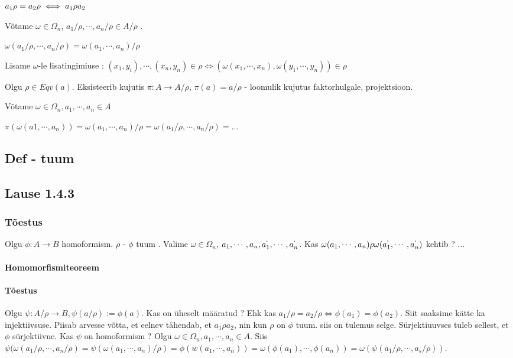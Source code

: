 \documentclass[12pt]{report}
\numberwithin{equation}{section}
\theoremstyle{definition}
\theoremstyle{plain}
\begin{document}
$a_1 \/ \rho = a_2 \/ \rho \iff a_1 \rho a_2$

Võtame $\omega \in \Omega_n$, $a_1 / \rho , \cdots , a_n / \rho \in A / \rho$ .

$\omega(a_1 / \rho , \cdots , a_n / \rho) = \omega(a_1,\cdots,a_n)/ \rho$

Lisame $\omega$-le lisatingimiuse : $(x_1,y_i),\cdots, (x_n,y_n)  \in \rho \iff ( \omega(x_1, \cdots , x_n), \omega(y_1,\cdots,y_n)) \in \rho$

Olgu $\rho \in Eqv(a)$.
Eksisteerib kujutis $ \pi : A \rightarrow A/ \rho$, $\pi (a) = a / \rho $ - loomulik kujutus faktorhulgale, projektsioon.


Võtame $\omega \in \Omega_n, a_1,\cdots,a_n \in A$

$\pi(\omega(a1,\cdots,a_n)) = \omega(a_1,\cdots,a_n)/\rho = \omega( a_1 / \rho, \cdots , a_n / \rho) = ...$

\subsection{Def - tuum}


\subsection{Lause 1.4.3}

\subsubsection*{Tõestus}
Olgu $\phi : A \rightarrow B$ homoformism. $\rho$ - $\phi $ tuum . 
Valime $\omega \in \Omega_n$, $a_1,\cdots,a_n,a_1^{`},\cdots,a_n^{`}$. Kas $\omega(a_1,\cdots ,a_n) \rho \omega(a_1^{`},\cdots ,a_n^{`})$ kehtib ? ...

\paragraph{Homomorfismiteoreem}

\paragraph*{Tõestus}
Olgu $\psi : A/ \rho \rightarrow B, \psi(a / \rho) := \phi(a)$. Kas on \"uheselt määratud ? Ehk kas $a_1/ \rho = a_2 / \rho \iff \phi(a_1) = \phi (a_2)$. Siit saaksime kätte ka injektiivsuse. Piisab arvesse võtta, et eelnev tähendab, et $a_1 \rho a_2$, nin kun $\rho$ on $\phi$ tuum. siis on tulemus selge. Sürjektiuuvses tuleb sellest, et $\phi$ sürjektiivne. 
Kas $\psi$ on homoformism ?
Olgu $\omega \in \Omega_n, a_1, \cdots, a_n \in A$.
Siis  $\psi(\omega(a_1 / \rho, \cdots, a_n / \rho) = \psi (\omega(a_1, \cdots, a_n) / \rho) = \phi(w(a_1,\cdots,a_n)) = \omega(\phi(a_1),\cdots, \phi(a_n)) = \omega(\psi(a_1 / \rho, \cdots, a_s / \rho)).$
\end{document}
